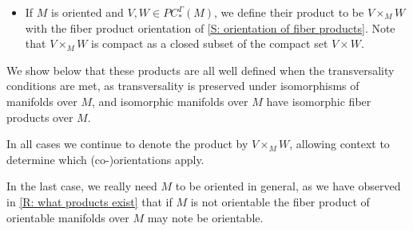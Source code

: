\begin{definition}
\begin{itemize}
			\item If $M$ is oriented and $V,W \in PC_*^\Gamma(M)$, we define their product to be $V \times_M W$ with the fiber product orientation of \cref{S: orientation of fiber products}.
			Note that $V \times_M W$ is compact as a closed subset of the compact set $V \times W$.
	\end{itemize}

	We show below that these products are all well defined when the transversality conditions are met, as transversality is preserved under isomorphisms of manifolds over $M$, and isomorphic manifolds over $M$ have isomorphic fiber products over $M$.

	In all cases we continue to denote the product by $V \times_M W$, allowing context to determine which (co\nobreakdash-)orientations apply.
\end{definition}



In the last case, we really need $M$ to be oriented in general, as we have observed in \cref{R: what products exist} that if $M$ is not orientable the fiber product of orientable manifolds over $M$ may note be orientable.

\begin{comment}
In the cases where $r_V$ and $r_W$ are transverse embeddings, these products are represented by just taking intersections, with the orientations or co-orientations given explicitly in \cref{P: normal pullback,P: cap of immersions,P: orient intersection}.
If $r_V$ and $r_W$ are immersions, these descriptions hold locally.
\end{comment}

